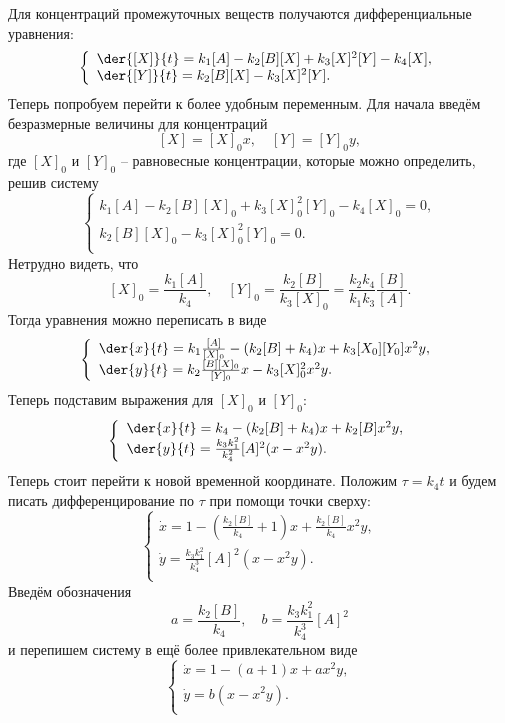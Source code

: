 Для концентраций промежуточных веществ получаются дифференциальные уравнения:
\[
    \left\{
        \begin{array}{l}
            \der{[X]}{t} = k_1[A] - k_2[B][X] + k_3[X]^2[Y] - k_4[X],\\
            \der{[Y]}{t} = k_2[B][X] - k_3[X]^2[Y].\\
        \end{array}
    \right.
\]
Теперь попробуем перейти к более удобным переменным. Для начала введём
безразмерные величины для концентраций
\[
    [X] = [X]_0 x,\quad [Y] = [Y]_0 y,
\]
где \( [X]_0 \) и \( [Y]_0 \) -- равновесные концентрации, которые можно
определить, решив систему
\[
    \left\{
        \begin{array}{l}
            k_1[A] - k_2[B][X]_0 + k_3[X]_0^2[Y]_0 - k_4[X]_0 = 0,\\
            k_2[B][X]_0 - k_3[X]_0^2[Y]_0 = 0.\\
        \end{array}
    \right.
\]
Нетрудно видеть, что
\[
    [X]_0 = \frac{k_1 [A]}{k_4},\quad [Y]_0 = \frac{k_2[B]}{k_3[X]_0} =
        \frac{k_2k_4}{k_1k_3}\frac{[B]}{[A]}.
\]
Тогда уравнения можно переписать в виде
\[
    \left\{
        \begin{array}{l}
            \der{x}{t} = k_1\frac{[A]}{[X]_0} - (k_2[B] + k_4)x +
                k_3[X_0][Y_0]x^2y,\\
            \der{y}{t} = k_2\frac{[B][X]_0}{[Y]_0}x -
                k_3[X]_0^2x^2y.\\
        \end{array}
    \right.
\]
Теперь подставим выражения для \( [X]_0 \) и \( [Y]_0 \):
\[
    \left\{
        \begin{array}{l}
            \der{x}{t} = k_4 - (k_2[B] + k_4)x + k_2[B]x^2y,\\
            \der{y}{t} = \frac{k_3k_1^2}{k_4^2}[A]^2 (x - x^2y).\\
        \end{array}
    \right.
\]
Теперь стоит перейти к новой временной координате. Положим \( \tau = k_4t \) и
будем писать дифференцирование по \( \tau \) при помощи точки сверху:
\[
    \left\{
        \begin{array}{l}
            \dot{x} = 1 - (\frac{k_2[B]}{k_4} + 1)x + \frac{k_2[B]}{k_4}x^2y,\\
            \dot{y} = \frac{k_3k_1^2}{k_4^3}[A]^2 (x - x^2y).\\
        \end{array}
    \right.
\]
Введём обозначения
\[
    a = \frac{k_2[B]}{k_4},\quad b = \frac{k_3k_1^2}{k_4^3}[A]^2
\]
и перепишем систему в ещё более привлекательном виде
\[
    \left\{
        \begin{array}{l}
            \dot{x} = 1 - (a + 1)x + ax^2y,\\
            \dot{y} = b(x - x^2y).\\
        \end{array}
    \right.
\]

